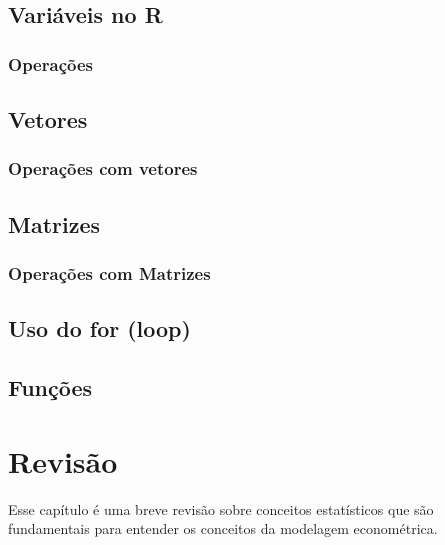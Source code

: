 \documentclass[
]{book}
\theoremstyle{definition}
\theoremstyle{definition}
\theoremstyle{definition}
\theoremstyle{remark}
\begin{document}
\hypertarget{variuxe1veis-no-r}{%
\section{Variáveis no R}\label{variuxe1veis-no-r}}

\hypertarget{operauxe7uxf5es-1}{%
\subsection{Operações}\label{operauxe7uxf5es-1}}

\hypertarget{vetores}{%
\section{Vetores}\label{vetores}}

\hypertarget{operauxe7uxf5es-com-vetores}{%
\subsection{Operações com vetores}\label{operauxe7uxf5es-com-vetores}}

\hypertarget{matrizes}{%
\section{Matrizes}\label{matrizes}}

\hypertarget{operauxe7uxf5es-com-matrizes}{%
\subsection{Operações com Matrizes}\label{operauxe7uxf5es-com-matrizes}}

\hypertarget{uso-do-for-loop}{%
\section{Uso do for (loop)}\label{uso-do-for-loop}}

\hypertarget{funuxe7uxf5es}{%
\section{Funções}\label{funuxe7uxf5es}}

\hypertarget{rev}{%
\chapter{Revisão}\label{rev}}

Esse capítulo é uma breve revisão sobre conceitos estatísticos que são fundamentais para entender os conceitos da modelagem econométrica.
\end{document}
